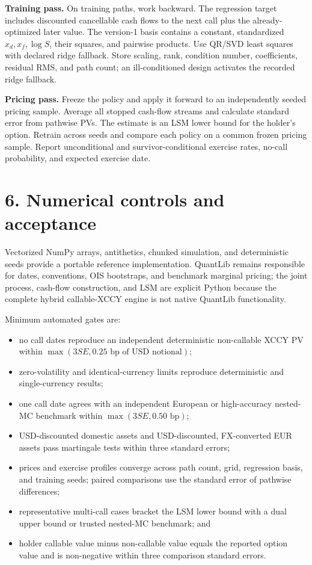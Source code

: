 \documentclass[9pt,letterpaper]{extarticle}
\begin{document}
\textbf{Training pass.} On training paths, work backward. The regression target includes discounted cancellable cash flows to the next call plus the already-optimized later value. The version-1 basis contains a constant, standardized $x_d,x_f,\log S$, their squares, and pairwise products. Use QR/SVD least squares with declared ridge fallback. Store scaling, rank, condition number, coefficients, residual RMS, and path count; an ill-conditioned design activates the recorded ridge fallback.

\textbf{Pricing pass.} Freeze the policy and apply it forward to an independently seeded pricing sample. Average all stopped cash-flow streams and calculate standard error from pathwise PVs. The estimate is an LSM lower bound for the holder's option. Retrain across seeds and compare each policy on a common frozen pricing sample. Report unconditional and survivor-conditional exercise rates, no-call probability, and expected exercise date.

\section{6. Numerical controls and acceptance}

Vectorized NumPy arrays, antithetics, chunked simulation, and deterministic seeds provide a portable reference implementation. QuantLib remains responsible for dates, conventions, OIS bootstraps, and benchmark marginal pricing; the joint process, cash-flow construction, and LSM are explicit Python because the complete hybrid callable-XCCY engine is not native QuantLib functionality.

Minimum automated gates are:
\begin{itemize}
 \item no call dates reproduce an independent deterministic non-callable XCCY PV within $\max(3SE,0.25\text{ bp of USD notional})$;
 \item zero-volatility and identical-currency limits reproduce deterministic and single-currency results;
 \item one call date agrees with an independent European or high-accuracy nested-MC benchmark within $\max(3SE,0.50\text{ bp})$;
 \item USD-discounted domestic assets and USD-discounted, FX-converted EUR assets pass martingale tests within three standard errors;
 \item prices and exercise profiles converge across path count, grid, regression basis, and training seeds; paired comparisons use the standard error of pathwise differences;
 \item representative multi-call cases bracket the LSM lower bound with a dual upper bound or trusted nested-MC benchmark; and
 \item holder callable value minus non-callable value equals the reported option value and is non-negative within three comparison standard errors.
\end{itemize}
\end{document}
